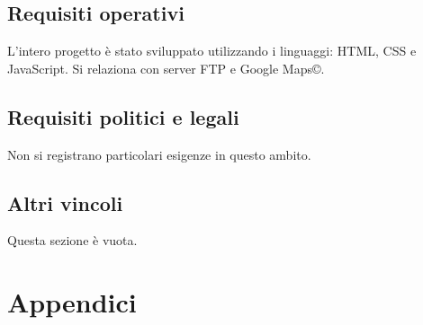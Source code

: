 \documentclass[a4paper,11pt]{article}       %
\begin{document}
    \subsection{Requisiti operativi}
    L'intero progetto è stato sviluppato utilizzando i linguaggi: HTML, CSS e JavaScript. Si relaziona con \gls{server FTP} e Google Maps©.
    
    \subsection{Requisiti politici e legali}
    Non si registrano particolari esigenze in questo ambito.
    
    \subsection{Altri vincoli}
    Questa sezione è vuota.
    
\clearpage
\section{Appendici}
    \printglossary[nonumberlist]
\end{document}
